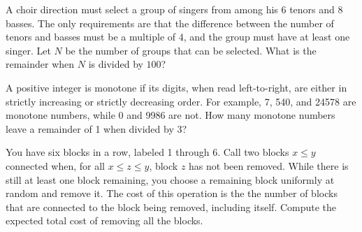 \documentclass{article}
\begin{document}
\begin{req}[AMC 12A 2021/15]{9}
A choir direction must select a group of singers from among his $6$ tenors and $8$ basses. The only requirements are that the difference between the number of tenors and basses must be a multiple of $4$, and the group must have at least one singer. Let $N$ be the number of groups that can be selected. What is the remainder when $N$ is divided by $100$?
\end{req}

    
    \begin{prob}{13}
A positive integer is monotone if its digits, when read left-to-right, are either in strictly increasing or strictly decreasing order. For example, 7, 540, and 24578 are monotone numbers, while 0 and 9986 are not. How many monotone numbers leave a remainder of 1 when divided by 3?
\end{prob}
    
    \begin{prob}{13}
You have six blocks in a row, labeled 1 through 6. Call two blocks $x \le y$
    connected when, for all $x \le z \le y$, block $z$ has not been removed. While there is still at least one block remaining, you choose a remaining block uniformly at random and remove it. The cost of this operation is the the number of blocks that are connected to the block being removed, including itself. Compute the expected total cost of removing all the blocks.
\end{prob}
\end{document}

